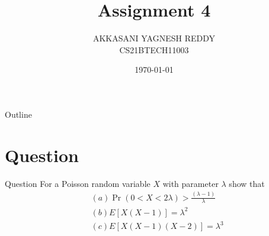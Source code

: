 \documentclass{beamer}
\title{Assignment 4}
\author{AKKASANI YAGNESH REDDY \\
     CS21BTECH11003 }
\date{\today}
\providecommand{\pr}[1]{\ensuremath{\Pr\left(#1\right)}}
\begin{document}
     \begin{frame}
     \maketitle    
     \end{frame}
     
     \logo{}
     
     \begin{frame}{Outline}
    \tableofcontents
     \end{frame}
     
     \section{Question}
     \begin{frame}{Question}
     For a Poisson random variable $X$ with parameter $\lambda$ show that \\
     \begin{align}
    &(a)\pr{0<X<2\lambda} > \frac{(\lambda-1)}{\lambda}\\
    &(b)E[X(X-1)]=\lambda^{2}\\
    &(c)E[X(X-1)(X-2)]=\lambda^{3}
    \end{align}\\
     \end{frame}
\end{document}
